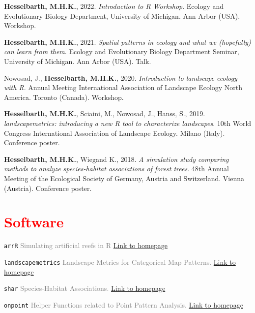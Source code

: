 \documentclass[12pt, hidelinks]{report}
\begin{document}
\begin{hangparas}{.25in}{1}

\textbf{Hesselbarth, M.H.K.}, 2022. \textit{Introduction to R Workshop}. Ecology and Evolutionary Biology Department, University of Michigan. Ann Arbor (USA). Workshop.

\textbf{Hesselbarth, M.H.K.}, 2021. \textit{Spatial patterns in ecology and what we (hopefully) can learn from them}. Ecology and Evolutionary Biology Department Seminar, University of Michigan. Ann Arbor (USA). Talk.

Nowosad, J., \textbf{Hesselbarth, M.H.K.}, 2020. \textit{Introduction to landscape ecology with R}. Annual Meeting International Association of Landscape Ecology North America. Toronto (Canada). Workshop.

\textbf{Hesselbarth, M.H.K.}, Sciaini, M., Nowosad, J., Hanss, S., 2019. \textit{landscapemetrics: introducing a new R tool to characterize landscapes}. 10th World Congress International Association of Landscape Ecology. Milano (Italy). Conference poster.

\textbf{Hesselbarth, M.H.K.}, Wiegand K., 2018. \textit{A simulation study comparing methods to analyze species-habitat associations of forest trees}. 48th Annual Meeting of the Ecological Society of Germany, Austria and Switzerland. Vienna (Austria). Conference poster.

\end{hangparas}


\section*{\textcolor{red}{Software} \sout{\hfill}}

\texttt{arrR} \textcolor{grey}{Simulating artificial reefs in R}
\hfill
\textcolor{blue}{\href{https://allgeier-lab.github.io/arrR/}{Link to homepage}}

\texttt{landscapemetrics} \textcolor{grey}{Landscape Metrics for Categorical Map Patterns.}
\hfill
\textcolor{blue}{\href{https://r-spatialecology.github.io/landscapemetrics/}{Link to homepage}}

\texttt{shar} \textcolor{grey}{Species-Habitat Associations.}
\hfill
\textcolor{blue}{\href{https://r-sptialecology.github.io/shar/}{Link to homepage}}

\texttt{onpoint} \textcolor{grey}{Helper Functions related to Point Pattern Analysis.}
\hfill
\textcolor{blue}{\href{https://r-spatialecology.github.io/onpoint/}{Link to homepage}}
\end{document}
